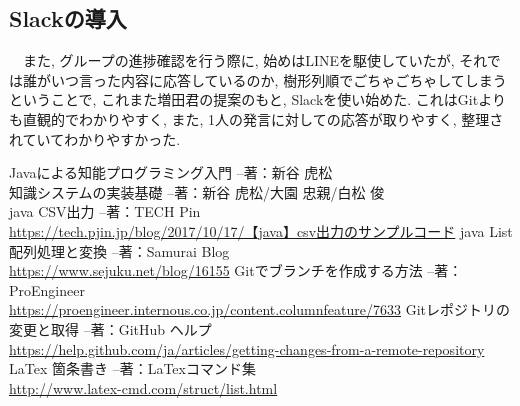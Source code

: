 \documentclass[uplatex,12pt]{jsarticle}
\begin{document}
\subsection{Slackの導入}
　また, グループの進捗確認を行う際に, 始めはLINEを駆使していたが, それでは誰がいつ言った内容に応答しているのか, 樹形列順でごちゃごちゃしてしまうということで, これまた増田君の提案のもと, Slackを使い始めた. これはGitよりも直観的でわかりやすく, また, 1人の発言に対しての応答が取りやすく, 整理されていてわかりやすかった.


\begin{thebibliography}{99}
 Javaによる知能プログラミング入門 --著：新谷 虎松 \\
 知識システムの実装基礎 --著：新谷 虎松/大園 忠親/白松 俊 \\
 java CSV出力 --著：TECH Pin \\
\url{https://tech.pjin.jp/blog/2017/10/17/【java】csv出力のサンプルコード}
 java List配列処理と変換 --著：Samurai Blog \\
\url{https://www.sejuku.net/blog/16155}
 Gitでブランチを作成する方法 --著：ProEngineer \\
\url{https://proengineer.internous.co.jp/content.columnfeature/7633}
 Gitレポジトリの変更と取得 --著：GitHub ヘルプ\\
\url{https://help.github.com/ja/articles/getting-changes-from-a-remote-repository}
 LaTex 箇条書き --著：LaTexコマンド集\\
\url{http://www.latex-cmd.com/struct/list.html}
\end{thebibliography}
\end{document}
